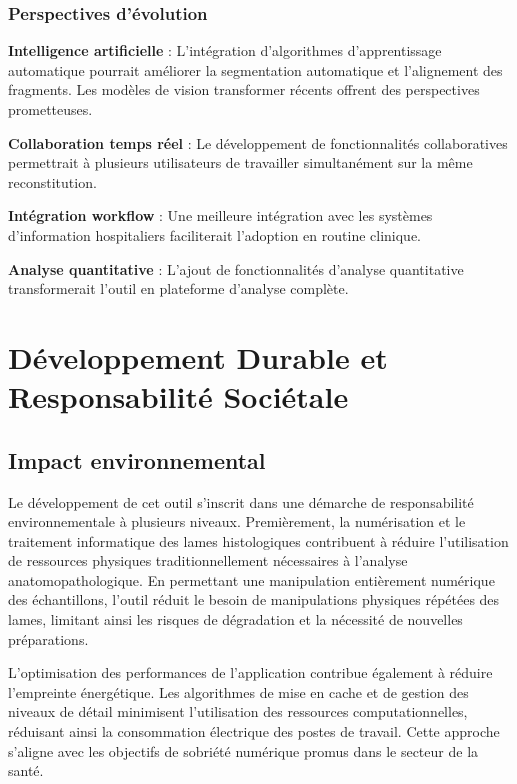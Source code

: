 \documentclass[12pt,a4paper]{report}
\begin{document}
\subsection{Perspectives d'évolution}

\textbf{Intelligence artificielle} : L'intégration d'algorithmes d'apprentissage automatique pourrait améliorer la segmentation automatique et l'alignement des fragments. Les modèles de vision transformer récents offrent des perspectives prometteuses.

\textbf{Collaboration temps réel} : Le développement de fonctionnalités collaboratives permettrait à plusieurs utilisateurs de travailler simultanément sur la même reconstitution.

\textbf{Intégration workflow} : Une meilleure intégration avec les systèmes d'information hospitaliers faciliterait l'adoption en routine clinique.

\textbf{Analyse quantitative} : L'ajout de fonctionnalités d'analyse quantitative transformerait l'outil en plateforme d'analyse complète.

\chapter{Développement Durable et Responsabilité Sociétale}

\section{Impact environnemental}

Le développement de cet outil s'inscrit dans une démarche de responsabilité environnementale à plusieurs niveaux. Premièrement, la numérisation et le traitement informatique des lames histologiques contribuent à réduire l'utilisation de ressources physiques traditionnellement nécessaires à l'analyse anatomopathologique. En permettant une manipulation entièrement numérique des échantillons, l'outil réduit le besoin de manipulations physiques répétées des lames, limitant ainsi les risques de dégradation et la nécessité de nouvelles préparations.

L'optimisation des performances de l'application contribue également à réduire l'empreinte énergétique. Les algorithmes de mise en cache et de gestion des niveaux de détail minimisent l'utilisation des ressources computationnelles, réduisant ainsi la consommation électrique des postes de travail. Cette approche s'aligne avec les objectifs de sobriété numérique promus dans le secteur de la santé.
\end{document}
